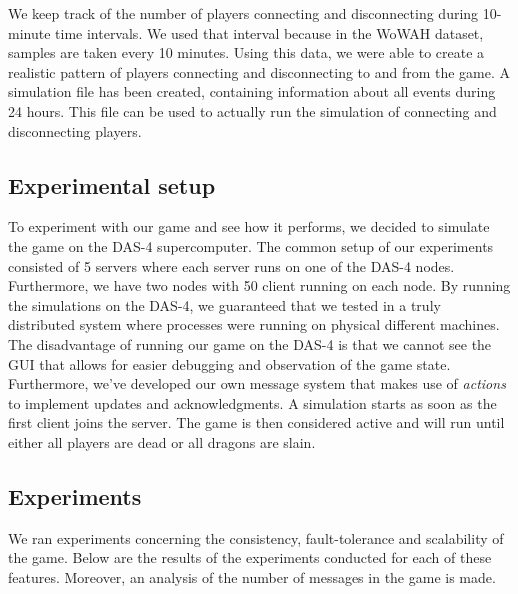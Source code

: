 We keep track of the number of players connecting and disconnecting during 10-minute time intervals.
We used that interval because in the WoWAH dataset, samples are taken every 10 minutes.
Using this data, we were able to create a realistic pattern of players connecting and disconnecting to and from the game.
A simulation file has been created, containing information about all events during 24 hours. This file can be used to actually run the simulation of connecting and disconnecting players.

\subsection{Experimental setup}
\label{subsec:experimental_setup}

	To experiment with our game and see how it performs, we decided to simulate the game on the DAS-4 supercomputer.
	The common setup of our experiments consisted of 5 servers where each server runs on one of the DAS-4 nodes. Furthermore, we have two nodes with 50 client running on each node.
	By running the simulations on the DAS-4, we guaranteed that we tested in a truly distributed system where processes were running on physical different machines.
	The disadvantage of running our game on the DAS-4 is that we cannot see the GUI that allows for easier debugging and observation of the game state.
	Furthermore, we've developed our own message system that makes use of \emph{actions} to implement updates and acknowledgments.
	A simulation starts as soon as the first client joins the server. The game is then considered active and will run until either all players are dead or all dragons are slain.


\subsection{Experiments}
\label{subsec:experiments}
	We ran experiments concerning the consistency, fault-tolerance and scalability of the game. Below are the results of the experiments conducted for each of these features. Moreover, an analysis of the number of messages in the game is made.

